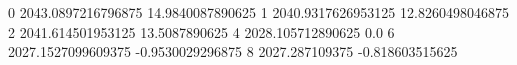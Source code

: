 0 2043.0897216796875 14.9840087890625
1 2040.9317626953125 12.8260498046875
2 2041.614501953125 13.5087890625
4 2028.105712890625 0.0
6 2027.1527099609375 -0.9530029296875
8 2027.287109375 -0.818603515625
